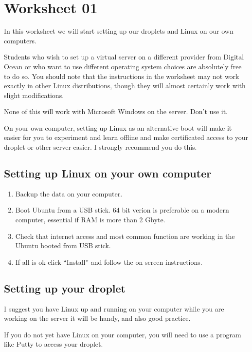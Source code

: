 \documentclass[12pt,a4paper]{article}
\begin{document}

\section*{Worksheet 01} 
In this worksheet we will start setting up our droplets and Linux on our own 
computers.

Students who wish to set up a virtual server on a different provider from 
Digital Ocean or who want to use different operating system choices are 
absolutely free to do so. You should note that the instructions in the worksheet may not work exactly in other Linux distributions, though they will almost certainly work with slight modifications.

None of this will work with Microsoft Windows on the server. Don't use it.

On your own computer, setting up Linux as an alternative boot will make it easier for you to experiment and learn offline and make certificated access to your droplet or other server easier. I strongly recommend you do this. 

\subsection*{Setting up Linux on your own computer}
\begin{enumerate}
 \item Backup the data on your computer.
 \item Boot Ubuntu from a USB stick. 64 bit verion is preferable on a modern computer,
  essential if RAM is more than 2 Gbyte.
 \item Check that internet access and most common function are working in the Ubuntu booted from USB stick.
 \item If all is ok click ``Install'' and follow the on screen instructions.
\end{enumerate}

\subsection*{Setting up your droplet}


I suggest you have Linux up and running on your computer while you are working on the server  it will be handy, and also good practice.

If you do not yet have Linux on your computer, you will need to use a program like Putty to access your droplet.
\end{document}
